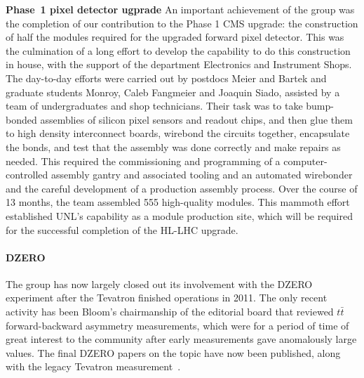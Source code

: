 {\bf Phase~1 pixel detector ugprade}
An important achievement of the group was the completion of our contribution to the Phase 1 CMS upgrade: the construction of half the modules required for the upgraded forward pixel detector.  This was the culmination of a long effort to develop the capability to do this construction in house, with the support of the department Electronics and Instrument Shops.  The day-to-day efforts were carried out by postdocs Meier and Bartek and graduate students Monroy, Caleb Fangmeier and Joaquin Siado, assisted by a team of undergraduates and shop technicians.  Their task was to take bump-bonded assemblies of silicon pixel sensors and readout chips, and then glue them to high density interconnect boards, wirebond the circuits together, encapsulate the bonds, and test that the assembly was done correctly and make repairs as needed.  This required the commissioning and programming of a computer-controlled assembly gantry and associated tooling and an automated wirebonder and the careful development of a production assembly process.  Over the course of 13 months, the team assembled 555 high-quality modules.
This mammoth effort established UNL's capability as a module production site, which will be required for the successful completion of the HL-LHC upgrade.

%

\paragraph{DZERO}
The group has now largely closed out its involvement with the DZERO experiment after the Tevatron finished operations in 2011.  The only recent activity has been Bloom's chairmanship of the editorial board that reviewed $t\bar{t}$ forward-backward asymmetry measurements, which were for a period of time of great interest to the community after early measurements gave anomalously large values.  The final DZERO papers on the topic have now been published, along with the legacy Tevatron measurement~\cite{bib:D0afb}.

